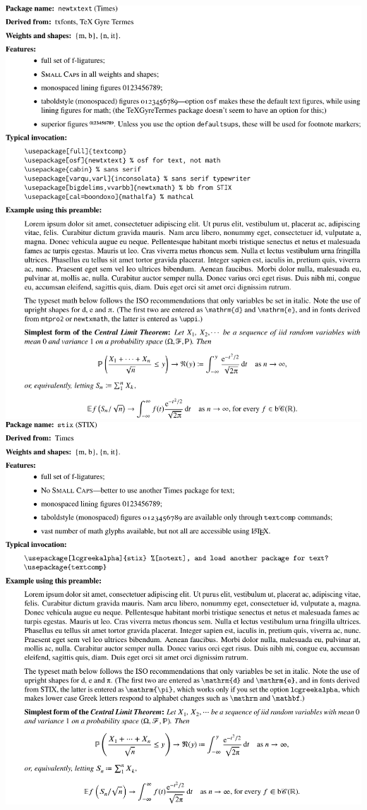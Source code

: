 \documentclass{article}
\begin{document}
\newpage
\hypertarget{lnk:newtx}{}
\includegraphics{ntxsamp-crop}
\newpage
\hypertarget{lnk:stix}{}
\includegraphics{stixsamp-crop}
\end{document}
